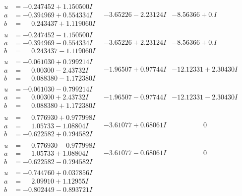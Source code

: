 \documentclass[1p]{elsarticle_modified}
\theoremstyle{definition}
\begin{document}
$$\begin{array}{c|c|c}
\begin{aligned}
u &= -0.247452 + 1.150500 I \\
a &= -0.394969 + 0.554334 I \\
b &= \phantom{-}0.243437 + 1.119060 I\end{aligned}
 & -3.65226 - 2.23124 I & -8.56366 + 0. I\phantom{ +0.000000I} \\ \hline\begin{aligned}
u &= -0.247452 - 1.150500 I \\
a &= -0.394969 - 0.554334 I \\
b &= \phantom{-}0.243437 - 1.119060 I\end{aligned}
 & -3.65226 + 2.23124 I & -8.56366 + 0. I\phantom{ +0.000000I} \\ \hline\begin{aligned}
u &= -0.061030 + 0.799214 I \\
a &= \phantom{-}0.00300 - 2.43732 I \\
b &= \phantom{-}0.088380 - 1.172380 I\end{aligned}
 & -1.96507 + 0.97744 I & -12.12331 + 2.30430 I \\ \hline\begin{aligned}
u &= -0.061030 - 0.799214 I \\
a &= \phantom{-}0.00300 + 2.43732 I \\
b &= \phantom{-}0.088380 + 1.172380 I\end{aligned}
 & -1.96507 - 0.97744 I & -12.12331 - 2.30430 I \\ \hline\begin{aligned}
u &= \phantom{-}0.776930 + 0.977998 I \\
a &= \phantom{-}1.05733 - 1.08804 I \\
b &= -0.622582 + 0.794582 I\end{aligned}
 & -3.61077 + 0.68061 I & \phantom{-0.000000 } 0 \\ \hline\begin{aligned}
u &= \phantom{-}0.776930 - 0.977998 I \\
a &= \phantom{-}1.05733 + 1.08804 I \\
b &= -0.622582 - 0.794582 I\end{aligned}
 & -3.61077 - 0.68061 I & \phantom{-0.000000 } 0 \\ \hline\begin{aligned}
u &= -0.744760 + 0.037856 I \\
a &= \phantom{-}2.09910 + 1.12955 I \\
b &= -0.802449 - 0.893721 I\end{aligned}

\end{array}$$
\end{document}
